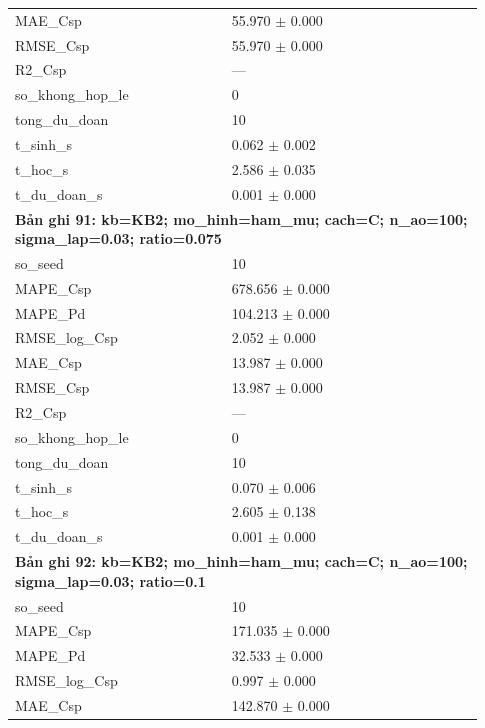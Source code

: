 \begin{longtable}{p{0.43\linewidth}p{0.50\linewidth}}
MAE\_\allowbreak Csp & 55.970 $\pm$ 0.000 \\
RMSE\_\allowbreak Csp & 55.970 $\pm$ 0.000 \\
R2\_\allowbreak Csp & — \\
so\_\allowbreak khong\_\allowbreak hop\_\allowbreak le & 0 \\
tong\_\allowbreak du\_\allowbreak doan & 10 \\
t\_\allowbreak sinh\_\allowbreak s & 0.062 $\pm$ 0.002 \\
t\_\allowbreak hoc\_\allowbreak s & 2.586 $\pm$ 0.035 \\
t\_\allowbreak du\_\allowbreak doan\_\allowbreak s & 0.001 $\pm$ 0.000 \\
\midrule
\multicolumn{2}{p{0.95\linewidth}}{\textbf{Bản ghi 91: kb=KB2; mo\_hinh=ham\_mu; cach=C; n\_ao=100; sigma\_lap=0.03; ratio=0.075}} \\
so\_\allowbreak seed & 10 \\
MAPE\_\allowbreak Csp & 678.656 $\pm$ 0.000 \\
MAPE\_\allowbreak Pd & 104.213 $\pm$ 0.000 \\
RMSE\_\allowbreak log\_\allowbreak Csp & 2.052 $\pm$ 0.000 \\
MAE\_\allowbreak Csp & 13.987 $\pm$ 0.000 \\
RMSE\_\allowbreak Csp & 13.987 $\pm$ 0.000 \\
R2\_\allowbreak Csp & — \\
so\_\allowbreak khong\_\allowbreak hop\_\allowbreak le & 0 \\
tong\_\allowbreak du\_\allowbreak doan & 10 \\
t\_\allowbreak sinh\_\allowbreak s & 0.070 $\pm$ 0.006 \\
t\_\allowbreak hoc\_\allowbreak s & 2.605 $\pm$ 0.138 \\
t\_\allowbreak du\_\allowbreak doan\_\allowbreak s & 0.001 $\pm$ 0.000 \\
\midrule
\multicolumn{2}{p{0.95\linewidth}}{\textbf{Bản ghi 92: kb=KB2; mo\_hinh=ham\_mu; cach=C; n\_ao=100; sigma\_lap=0.03; ratio=0.1}} \\
so\_\allowbreak seed & 10 \\
MAPE\_\allowbreak Csp & 171.035 $\pm$ 0.000 \\
MAPE\_\allowbreak Pd & 32.533 $\pm$ 0.000 \\
RMSE\_\allowbreak log\_\allowbreak Csp & 0.997 $\pm$ 0.000 \\
MAE\_\allowbreak Csp & 142.870 $\pm$ 0.000 \\

\end{longtable}
